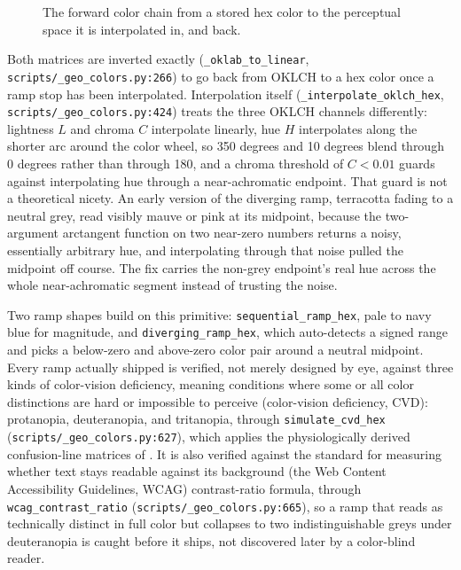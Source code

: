 \documentclass[11pt]{article}
\begin{document}
\begin{figure}[htbp]
\centering
{}
\caption{The forward color chain from a stored hex color to the perceptual space it is interpolated in, and back.}
\end{figure}

Both matrices are inverted exactly (\texttt{\_oklab\_to\_linear},
\texttt{scripts/\_geo\_colors.py:266}) to go back from OKLCH to a hex
color once a ramp stop has been interpolated. Interpolation itself
(\texttt{\_interpolate\_oklch\_hex}, \texttt{scripts/\_geo\_colors.py:424})
treats the three OKLCH channels differently: lightness $L$ and chroma
$C$ interpolate linearly, hue $H$ interpolates along the shorter arc
around the color wheel, so 350 degrees and 10 degrees blend through 0
degrees rather than through 180, and a chroma threshold of $C < 0.01$
guards against interpolating hue through a near-achromatic endpoint.
That guard is not a theoretical nicety. An early version of the
diverging ramp, terracotta fading to a neutral grey, read visibly
mauve or pink at its midpoint, because the two-argument arctangent
function on two near-zero numbers returns a noisy, essentially
arbitrary hue, and interpolating through that noise pulled the midpoint
off course. The fix carries the non-grey endpoint's real hue across the
whole near-achromatic segment instead of trusting the noise.

Two ramp shapes build on this primitive: \texttt{sequential\_ramp\_hex},
pale to navy blue for magnitude, and \texttt{diverging\_ramp\_hex}, which
auto-detects a signed range and picks a below-zero and above-zero color
pair around a neutral midpoint. Every ramp actually shipped is verified,
not merely designed by eye, against three kinds of color-vision
deficiency, meaning conditions where some or all color distinctions are
hard or impossible to perceive (color-vision deficiency, CVD):
protanopia, deuteranopia, and tritanopia, through
\texttt{simulate\_cvd\_hex} (\texttt{scripts/\_geo\_colors.py:627}), which
applies the physiologically derived confusion-line matrices of
\textcite{machado-cvd}. It is also verified against the standard for
measuring whether text stays readable against its background (the Web
Content Accessibility Guidelines, WCAG) contrast-ratio formula, through
\texttt{wcag\_contrast\_ratio} (\texttt{scripts/\_geo\_colors.py:665}), so
a ramp that reads as technically distinct in full color but collapses
to two indistinguishable greys under deuteranopia is caught before it
ships, not discovered later by a color-blind reader.
\end{document}
